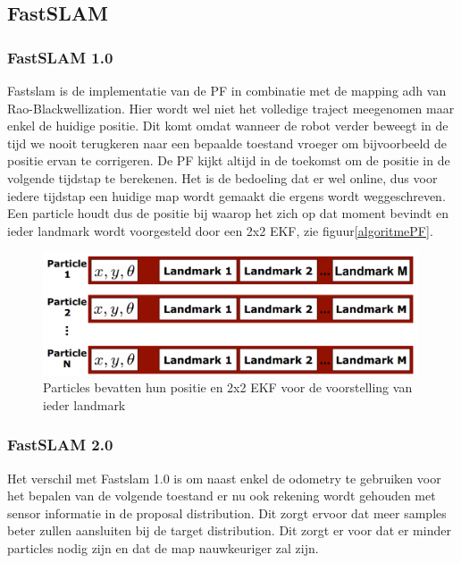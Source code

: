 \documentclass{book}
\begin{document}
\subsection{FastSLAM}
\subsubsection{FastSLAM 1.0}
Fastslam is de implementatie van de PF in combinatie met de mapping adh van Rao-Blackwellization. Hier wordt wel niet het volledige traject meegenomen maar enkel de huidige positie. Dit komt omdat wanneer de robot verder beweegt in de tijd we nooit terugkeren naar een bepaalde toestand vroeger om bijvoorbeeld de positie ervan te corrigeren. De PF kijkt altijd in de toekomst om de positie in de volgende tijdstap te berekenen. Het is de bedoeling dat er wel online, dus voor iedere tijdstap een huidige map wordt gemaakt die ergens wordt weggeschreven. Een particle houdt dus de positie bij waarop het zich op dat moment bevindt en ieder landmark wordt voorgesteld door een 2x2 EKF, zie figuur\ref{algoritmePF}.

\begin{figure}[H]
\centering
\includegraphics[width = 0.99\textwidth]{fastslam.png}
\caption{Particles bevatten hun positie en 2x2 EKF voor de voorstelling van ieder landmark}
\label{fastslam}
\end{figure}

\subsubsection{FastSLAM 2.0}
Het verschil met Fastslam 1.0 is om naast enkel de odometry te gebruiken voor het bepalen van de volgende toestand er nu ook rekening wordt gehouden met sensor informatie in de proposal distribution. Dit zorgt ervoor dat meer samples beter zullen aansluiten bij de target distribution. Dit zorgt er voor dat er minder particles nodig zijn en dat de map nauwkeuriger zal zijn.
\end{document}
